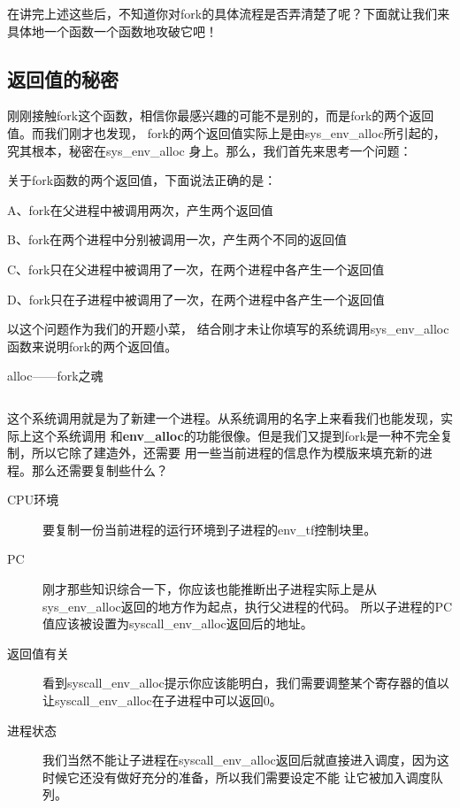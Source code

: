 在讲完上述这些后，不知道你对fork的具体流程是否弄清楚了呢？下面就让我们来具体地一个函数一个函数地攻破它吧！

\subsection{返回值的秘密}

刚刚接触fork这个函数，相信你最感兴趣的可能不是别的，而是fork的两个返回值。而我们刚才也发现，
fork的两个返回值实际上是由sys\_env\_alloc所引起的，究其根本，秘密在sys\_env\_alloc
身上。那么，我们首先来思考一个问题：

\begin{thinking}\label{think-fork的调用}
 关于fork函数的两个返回值，下面说法正确的是：
 
  A、fork在父进程中被调用两次，产生两个返回值
  
  B、fork在两个进程中分别被调用一次，产生两个不同的返回值
  
  C、fork只在父进程中被调用了一次，在两个进程中各产生一个返回值
  
  D、fork只在子进程中被调用了一次，在两个进程中各产生一个返回值
\end{thinking}

以这个问题作为我们的开题小菜，
结合刚才未让你填写的系统调用sys\_env\_alloc函数来说明fork的两个返回值。

\begin{codeBoxWithCaption}{alloc——fork之魂\label{code:sys_env_alloc.c}}
  \inputminted[linenos]{c}{codes/sys_env_alloc.c}
\end{codeBoxWithCaption}

这个系统调用就是为了新建一个进程。从系统调用的名字上来看我们也能发现，实际上这个系统调用
和\textbf{env\_alloc}的功能很像。但是我们又提到fork是一种不完全复制，所以它除了建造外，还需要
用一些当前进程的信息作为模版来填充新的进程。那么还需要复制些什么？

\begin{description}
 \item [CPU环境] 要复制一份当前进程的运行环境到子进程的env\_tf控制块里。
 \item [PC] 刚才那些知识综合一下，你应该也能推断出子进程实际上是从sys\_env\_alloc返回的地方作为起点，执行父进程的代码。
 所以子进程的PC值应该被设置为syscall\_env\_alloc返回后的地址。
 \item [返回值有关] 看到syscall\_env\_alloc提示你应该能明白，我们需要调整某个寄存器的值以让syscall\_env\_alloc在子进程中可以返回0。
 \item [进程状态] 我们当然不能让子进程在syscall\_env\_alloc返回后就直接进入调度，因为这时候它还没有做好充分的准备，所以我们需要设定不能
 让它被加入调度队列。
 \end{description}

